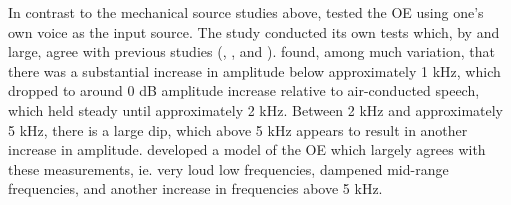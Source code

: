 In contrast to the mechanical source studies above, \cite{hansen:97b} tested the OE using one's own voice as the input source.  %
%
%
The study conducted its own tests %
which, by and large, agree with %
previous studies (\cite{wimmer:86}, \cite{thorup:96}, and \cite{may:92}).  \cite{hansen:97b} found, among much variation, that there was a substantial increase in amplitude below approximately 1 kHz, which dropped to around 0 dB amplitude increase relative to air-conducted speech, which held steady until approximately 2 kHz.  Between 2 kHz and approximately 5 kHz, there is a large dip, which above 5 kHz appears to result in another increase in amplitude.  \cite{hansen:97b} developed a model of the OE which largely agrees with these measurements, ie. very loud low frequencies, dampened mid-range frequencies, and another increase in frequencies above 5 kHz.

